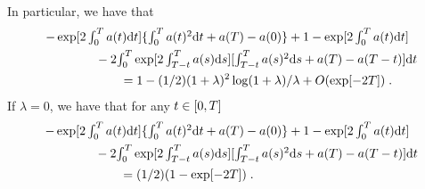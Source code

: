 \begin{proposition}
      In particular, we have that 
  \begin{align}
        & \textstyle{-\exp[2\int_0^T a(t) \mathrm{d}t]\{ \int_0^Ta(t)^2 \mathrm{d}t + a(T) - a(0)\} + 1 - \exp[2\int_0^T a(t) \mathrm{d}t]} \\
        & \qquad \qquad - 2 \textstyle{\int_0^T \exp[2\int_{T-t}^T a(s) \mathrm{d}s] [\int_{T-t}^T a(s)^2 \mathrm{d}s + a(T) - a(T-t)] \mathrm{d}t } \\
    & \qquad \qquad \qquad = 1 - (1/2) (1+\lambda)^2\log(1+\lambda)/\lambda + O(\exp[-2T]) \; . 
  \end{align}  
  If $\lambda = 0$, we have that for any $t \in \left[0,T\right]$
  \begin{align}
        &\textstyle{-\exp[2\int_0^T a(t) \mathrm{d}t]\{ \int_0^Ta(t)^2 \mathrm{d}t + a(T) - a(0)\} + 1 - \exp[2\int_0^T a(t) \mathrm{d}t]} \\
        & \qquad \qquad - 2 \textstyle{\int_0^T \exp[2\int_{T-t}^T a(s) \mathrm{d}s] [\int_{T-t}^T a(s)^2 \mathrm{d}s + a(T) - a(T-t)] \mathrm{d}t } \\
    & \qquad \qquad \qquad = (1/2)(1 - \exp[-2T]) \; . 
  \end{align}

  \end{proposition}

